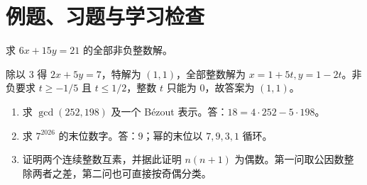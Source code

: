 \section{例题、习题与学习检查}
\begin{example}
求 $6x+15y=21$ 的全部非负整数解。
\end{example}
\begin{solve}
除以 $3$ 得 $2x+5y=7$，特解为 $(1,1)$，全部整数解为 $x=1+5t,y=1-2t$。非负要求 $t\ge-1/5$ 且 $t\le1/2$，整数 $t$ 只能为 $0$，故答案为 $(1,1)$。
\end{solve}
\begin{enumerate}
\item 求 $\gcd(252,198)$ 及一个 Bézout 表示。答：$18=4\cdot252-5\cdot198$。
\item 求 $7^{2026}$ 的末位数字。答：$9$；幂的末位以 $7,9,3,1$ 循环。
\item 证明两个连续整数互素，并据此证明 $n(n+1)$ 为偶数。第一问取公因数整除两者之差，第二问也可直接按奇偶分类。
\end{enumerate}

